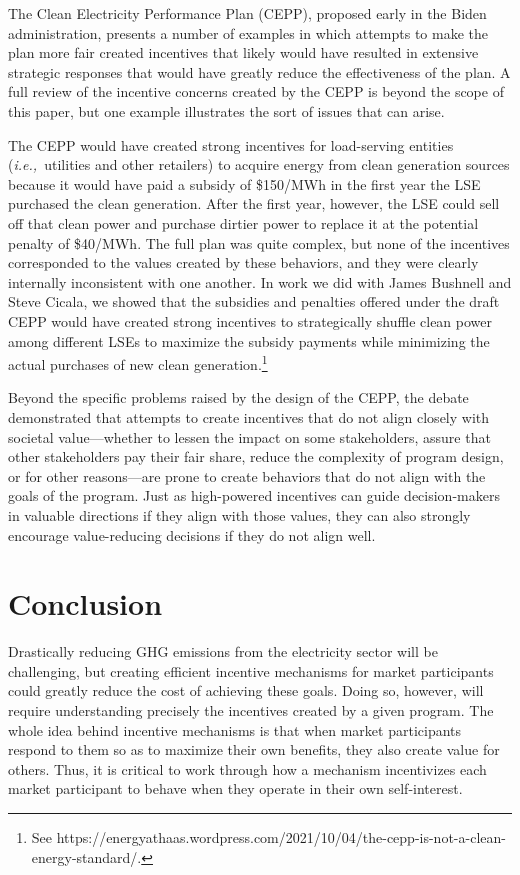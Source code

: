 \documentclass[12pt]{article}
\def\ie{{\it i.e.,\ }}
\begin{document}
The Clean Electricity Performance Plan (CEPP), proposed early in the Biden administration, presents a number of examples in which attempts to make the plan more fair created incentives that likely would have resulted in extensive strategic responses that would have  greatly reduce the effectiveness of the plan.  A full review of the incentive concerns created by the CEPP is beyond the scope of this paper, but one example illustrates the sort of issues that can arise.

The CEPP would have created strong incentives for load-serving entities (\ie utilities and other retailers) to acquire energy from clean generation sources because it would have paid a subsidy of \$150/MWh in the first year the LSE purchased the clean generation. After the first year, however, the LSE could sell off that clean power and purchase dirtier power to replace it at the potential penalty of \$40/MWh.  The full plan was quite complex, but none of the incentives corresponded to the values created by these behaviors, and they were clearly internally inconsistent with one another.  In work we did with James Bushnell and Steve Cicala, we showed that the subsidies and penalties offered under the draft CEPP would have created strong incentives to strategically shuffle clean power among different LSEs to maximize the subsidy payments while minimizing the actual purchases of new clean generation.\footnote{See https://energyathaas.wordpress.com/2021/10/04/the-cepp-is-not-a-clean-energy-standard/.}  

Beyond the specific problems raised by the design of the CEPP, the debate demonstrated that attempts to create incentives that do not align closely with societal value---whether to lessen the impact on some stakeholders, assure that other stakeholders pay their fair share, reduce the complexity of program design, or for other reasons---are prone to create behaviors that do not align with the goals of the program.  Just as high-powered incentives can guide decision-makers in valuable directions if they align with those values, they can also strongly encourage value-reducing decisions if they do not align well.


\section{Conclusion}

Drastically reducing GHG emissions from the electricity sector will be challenging, but creating efficient incentive mechanisms for market participants could greatly reduce the cost of achieving these goals. Doing so, however, will require understanding precisely the incentives created by a given program. The whole idea behind incentive mechanisms is that when  market participants respond to them so as to maximize their own benefits, they also create value for others. Thus, it is critical to work through how a mechanism incentivizes each market participant to behave when they operate in  their own  self-interest.
\end{document}
